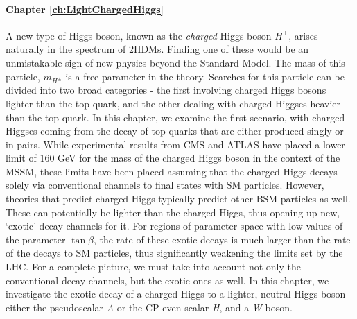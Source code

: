 \paragraph{Chapter \ref{ch:LightChargedHiggs}} 
A new type of Higgs boson, known as the \emph{charged} Higgs boson $H^\pm$, arises naturally in the spectrum of $2$HDMs. Finding one of these would be an unmistakable sign of new physics beyond the Standard Model. The mass of this particle, $m_{H^\pm}$ is a free parameter in the theory. Searches for this particle can be divided into two broad categories - the first involving charged Higgs bosons lighter than the top quark, and the other dealing with charged Higgses heavier than the top quark. In this chapter, we examine the first scenario, with charged Higgses coming from the decay of top quarks that are either produced singly or in pairs. While experimental results from CMS and ATLAS  have placed a lower limit of 160 GeV for the mass of the charged Higgs boson in the context of the MSSM, these limits have been placed assuming that the charged Higgs decays solely via conventional channels to final states with SM particles. However, theories that predict charged Higgs typically predict other BSM particles as well. These can potentially be lighter than the charged Higgs, thus opening up new, `exotic' decay channels for it. For regions of parameter space with low values of the parameter $\tan\beta$, the rate of these exotic decays is much larger than the rate of the decays to SM particles, thus significantly weakening the limits set by the LHC. For a complete picture, we must take into account not only the conventional decay channels, but the exotic ones as well. In this chapter, we investigate the exotic decay of a charged Higgs to a lighter, neutral Higgs boson - either the pseudoscalar \emph{A} or the CP-even scalar \emph{H}, and a \emph{W} boson. 
